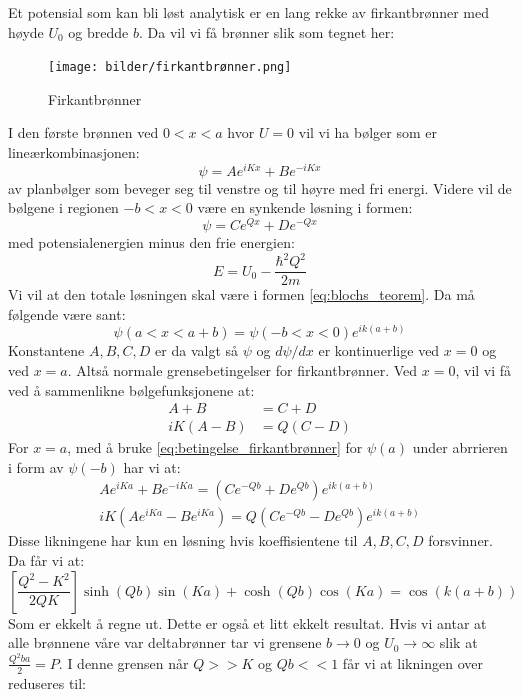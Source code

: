 \documentclass{article}
\begin{document}
Et potensial som kan bli løst analytisk er en lang rekke av firkantbrønner med høyde $U_0$ og bredde $b$. Da vil vi få brønner slik som tegnet her:
\begin{figure}[H]
    \centering
    \texttt{[image: bilder/firkantbrønner.png]}
    \caption{Firkantbrønner}
    \label{fig:firkantbrønner}
\end{figure}
I den første brønnen ved $0 < x < a$ hvor $U = 0$ vil vi ha bølger som er lineærkombinasjonen:
\begin{equation}
    \psi = Ae^{iKx} + Be^{-iKx}
\end{equation}
av planbølger som beveger seg til venstre og til høyre med fri energi. Videre vil de bølgene i regionen $-b < x < 0$ være en synkende løsning i formen:
\begin{equation}
    \psi = Ce^{Qx} + De^{-Qx}
\end{equation}
med potensialenergien minus den frie energien:
\begin{equation}
    E = U_0 - \frac{\hbar^2 Q^2}{2m} 
\end{equation}
Vi vil at den totale løsningen skal være i formen \ref{eq:blochs_teorem}. Da må følgende være sant:
\begin{equation}
    \label{eq:betingelse_firkantbrønner}
    \psi(a < x < a + b) = \psi(-b < x < 0)e^{ik(a+b)}
\end{equation}
Konstantene $A, B, C, D$ er da valgt så $\psi$ og $d\psi / dx$ er kontinuerlige ved $x = 0$ og ved $x = a$. Altså normale grensebetingelser for firkantbrønner. Ved $x = 0$, vil vi få ved å sammenlikne bølgefunksjonene at:
\begin{align}
    A + B &= C + D \\
    iK(A-B) &= Q(C-D)
\end{align}
For $x=a$, med å bruke \ref{eq:betingelse_firkantbrønner} for $\psi(a)$ under abrrieren i form av $\psi(-b)$ har vi at:
\begin{align}
    Ae^{iKa} + Be^{-iKa} = (Ce^{-Qb}+De^{Qb}) e^{ik(a+b)} \\
    iK(Ae^{iKa} - Be^{iKa}) = Q(Ce^{-Qb}-De^{Qb}) e^{ik(a+b)}
\end{align}
Disse likningene har kun en løsning hvis koeffisientene til $A,B,C,D$ forsvinner. Da får vi at:
\begin{equation}
    \left[\frac{Q^2-K^2}{2QK}\right] \sinh(Qb) \sin(Ka) + \cosh(Qb) \cos(Ka) = \cos(k(a+b))
\end{equation}
Som er ekkelt å regne ut. Dette er også et litt ekkelt resultat. Hvis vi antar at alle brønnene våre var deltabrønner tar vi grensene $b \rightarrow 0$ og $U_0 \rightarrow \infty$ slik at $\frac{Q^2 ba}{2}=P$. I denne grensen når $Q >> K$ og $Qb << 1$ får vi at likningen over reduseres til:
\end{document}
